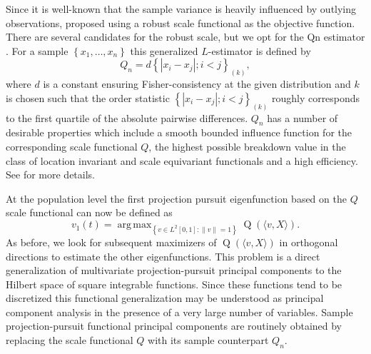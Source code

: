 \documentclass[11pt]{article}
\DeclareMathOperator{\Q}{Q}
\DeclareMathOperator*{\argmax}{arg\,max}
\begin{document}
Since it is well-known that the sample variance is heavily influenced by outlying observations, \citet{bali2011robust} proposed using a robust scale functional as the objective function. There are several candidates for the robust scale, but we opt for the Qn estimator \citep{rousseeuw1993alternatives}. For a sample $\left\{x_1, \ldots, x_n \right\}$ this generalized $L$-estimator is defined by
\begin{equation}
Q_n = d \left\{| x_i - x_j|; i<j \right\}_{(k)},
\end{equation}
where $d$ is a constant ensuring Fisher-consistency at the given distribution and $k$ is chosen such that the order statistic $\left\{| x_i - x_j|; i<j \right\}_{(k)}$ roughly corresponds to the first quartile of the absolute pairwise differences. $Q_n$ has a number of desirable properties which include a smooth bounded influence function for the corresponding scale functional $Q$, the highest possible breakdown value in the class of location invariant and scale equivariant functionals and a high efficiency. See \cite{rousseeuw1993alternatives} for more details.

At the population level the first projection pursuit eigenfunction based on the $Q$ scale functional can now be defined as
\begin{equation}
v_1(t) = \argmax_{\left\{v \in L^2[0,1]: \left\|v \right\| = 1 \right\}} \Q \left( \langle v, X \rangle \right).
\end{equation}
As before, we look for subsequent maximizers of $\Q \left( \langle v, X \rangle \right)$ in orthogonal directions to estimate the other eigenfunctions. This problem is a direct generalization of multivariate projection-pursuit principal components \citep{li1985projection,croux2005high} to the Hilbert space of square integrable functions. Since these functions tend to be discretized this functional generalization may be understood as principal component analysis in the presence of a very large number of variables. Sample projection-pursuit functional principal components are routinely obtained by replacing the scale functional $Q$ with its sample counterpart $Q_n$.
\end{document}
